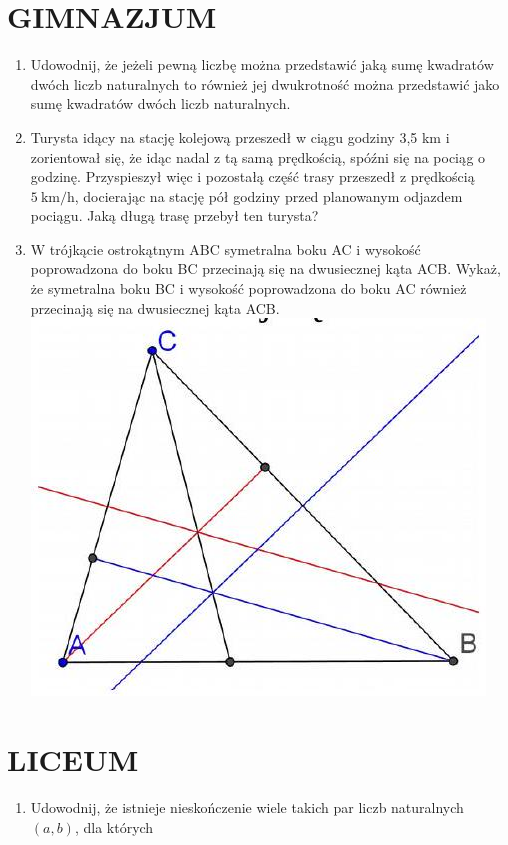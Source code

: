 \documentclass[10pt]{article}
\begin{document}
\section*{GIMNAZJUM}
\begin{enumerate}
  \item Udowodnij, że jeżeli pewną liczbę można przedstawić jaką sumę kwadratów dwóch liczb naturalnych to również jej dwukrotność można przedstawić jako sumę kwadratów dwóch liczb naturalnych.
  \item Turysta idący na stację kolejową przeszedł w ciągu godziny 3,5 km i zorientował się, że idąc nadal z tą samą prędkością, spóźni się na pociąg o godzinę. Przyspieszył więc i pozostałą część trasy przeszedł z prędkością \(5 \mathrm{~km} / \mathrm{h}\), docierając na stację pół godziny przed planowanym odjazdem pociągu. Jaką długą trasę przebył ten turysta?
  \item W trójkącie ostrokątnym ABC symetralna boku AC i wysokość poprowadzona do boku BC przecinają się na dwusiecznej kąta ACB. Wykaż, że symetralna boku BC i wysokość poprowadzona do boku AC również przecinają się na dwusiecznej kąta ACB.\\
\includegraphics[max width=\textwidth, center]{2024_11_21_40fef43eb120b459cab8g-1(1)}
\end{enumerate}

\section*{LICEUM}
\begin{enumerate}
  \item Udowodnij, że istnieje nieskończenie wiele takich par liczb naturalnych \((a, b)\), dla których
\end{enumerate}
\end{document}
